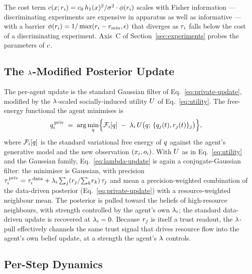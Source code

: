The cost term $c(x;r_{i}) =
c_{0}\,h_{1}(x)^{2}/\sigma^{2}\cdot \phi(r_{i})$ scales
with Fisher information --- discriminating experiments are expensive
in apparatus as well as informative --- with a barrier
$\phi(r_{i}) = 1/\max(r_{i} - r_{\min}, \epsilon)$ that
diverges as $r_{i}$ falls below the cost of a discriminating
experiment. Axis~C of Section~\ref{sec:experiments} probes the
parameters of $c$.

\subsection{The $\lambda$-Modified Posterior Update}
\label{ssec:update}

The per-agent update is the standard Gaussian filter of
Eq.~\eqref{eq:private-update}, modified by the $\lambda$-scaled
socially-induced utility $U$ of Eq.~\eqref{eq:utility}. The
free-energy functional the agent minimises is
\begin{equation}
q_i^{\,\mathrm{priv}}
\;=\;
\arg\min_{q}
\Bigl\{
  \mathcal{F}_i[q]
  \;-\;
  \lambda_{i}\,U\bigl(q;\,\{q_j(t), r_{j}(t)\}_j\bigr)
\Bigr\},
\label{eq:lambda-update}
\end{equation}
where $\mathcal{F}_i[q]$ is the standard variational free energy of $q$
against the agent's generative model and the new observation
$(x_i, o_i)$. With $U$ as in Eq.~\eqref{eq:utility} and
the Gaussian family, Eq.~\eqref{eq:lambda-update} is again a
conjugate-Gaussian filter: the minimiser is Gaussian, with precision
$\tau_i^{\,\mathrm{priv}} = \tau_i^{\,\mathrm{data}} +
\lambda_{i}\sum_{j} (r_{j}/\!\sum_k\!r_{k})\,\tau_j$
and mean a precision-weighted combination of the data-driven posterior
(Eq.~\ref{eq:private-update}) with a resource-weighted neighbour mean.
The posterior is pulled toward the beliefs of high-resource
neighbours, with strength controlled by the agent's own $\lambda_{i}$;
the standard data-driven update is recovered at $\lambda_{i} = 0$.
Because $r_{j}$ is itself a trust readout, the
$\lambda$-pull effectively channels the same trust signal that drives
resource flow into the agent's own belief update, at a strength the
agent's $\lambda$ controls.

\subsection{Per-Step Dynamics}
\label{ssec:dynamics}

